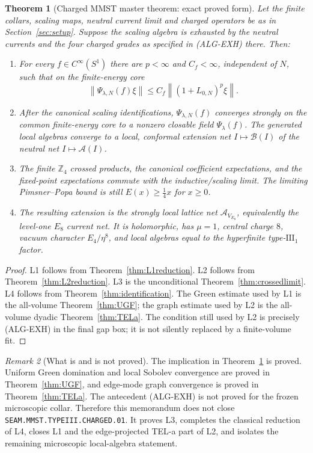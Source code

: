 \documentclass[11pt]{article}
\newtheorem{theorem}{Theorem}[section]
\theoremstyle{remark}
\newtheorem{remark}[theorem]{Remark}
\newcommand{\A}{\mathcal A}
\newcommand{\B}{\mathcal B}
\newcommand{\Z}{\mathbb Z}
\newcommand{\norm}[1]{\left\lVert#1\right\rVert}
\begin{document}
\begin{theorem}[Charged MMST master theorem: exact proved form]
\label{thm:master}
Let the finite collars, scaling maps, neutral current limit and charged
operators be as in Section~\ref{sec:setup}.  Suppose the scaling algebra
is exhausted by the neutral currents and
the four charged grades as specified in \textup{(ALG-EXH)} there.  Then:
\begin{enumerate}[label=\textup{(L\arabic*)}]
\item For every $f\in C^\infty(S^1)$ there are $p<\infty$ and
  $C_f<\infty$, independent of $N$, such that on the finite-energy core
  \[
    \norm{\Psi_{\lambda,N}(f)\xi}
    \le C_f\norm{(1+L_{0,N})^p\xi}.
  \tag{1.1}\label{eq:L1}
  \]
\item After the canonical scaling identifications,
  $\Psi_{\lambda,N}(f)$ converges strongly on the common finite-energy
  core to a nonzero closable field $\Psi_\lambda(f)$.  The generated local
  algebras converge to a local, conformal extension net
  $I\mapsto\B(I)$ of the neutral net $I\mapsto\A(I)$.
\item The finite $\Z_4$ crossed products, the canonical coefficient
  expectations, and the fixed-point expectations commute with the
  inductive/scaling limit.  The limiting Pimsner--Popa bound is still
  $E(x)\ge\frac14x$ for $x\ge0$.
\item The resulting extension is the strongly local lattice net
  $\A_{V_{E_8}}$, equivalently the level-one $E_8$ current net.  It is
  holomorphic, has $\mu=1$, central charge $8$, vacuum character
  $E_4/\eta^8$, and local algebras equal to the hyperfinite
  type-$\mathrm{III}_1$ factor.
\end{enumerate}
\end{theorem}

\begin{proof}
L1 follows from Theorem~\ref{thm:L1reduction}.  L2 follows from
Theorem~\ref{thm:L2reduction}.  L3 is the unconditional
Theorem~\ref{thm:crossedlimit}.  L4 follows from
Theorem~\ref{thm:identification}.  The Green estimate used by L1 is the
all-volume Theorem~\ref{thm:UGF}; the graph estimate used by L2 is the
all-volume dyadic Theorem~\ref{thm:TELa}.  The condition still used by L2
is precisely \textup{(ALG-EXH)} in the final gap box; it is not silently
replaced by a finite-volume fit.
\end{proof}

\begin{remark}[What is and is not proved]
The implication in Theorem~\ref{thm:master} is proved.  Uniform Green
domination and local Sobolev convergence are proved in
Theorem~\ref{thm:UGF}, and edge-mode graph convergence is proved in
Theorem~\ref{thm:TELa}.  The antecedent \textup{(ALG-EXH)} is not proved
for the frozen microscopic collar.  Therefore
this memorandum does not close
\texttt{SEAM.MMST.TYPEIII.CHARGED.01}.  It proves L3, completes the
classical reduction of L4, closes L1 and the edge-projected TEL-a part
of L2, and isolates the remaining microscopic local-algebra statement.
\end{remark}
\end{document}
